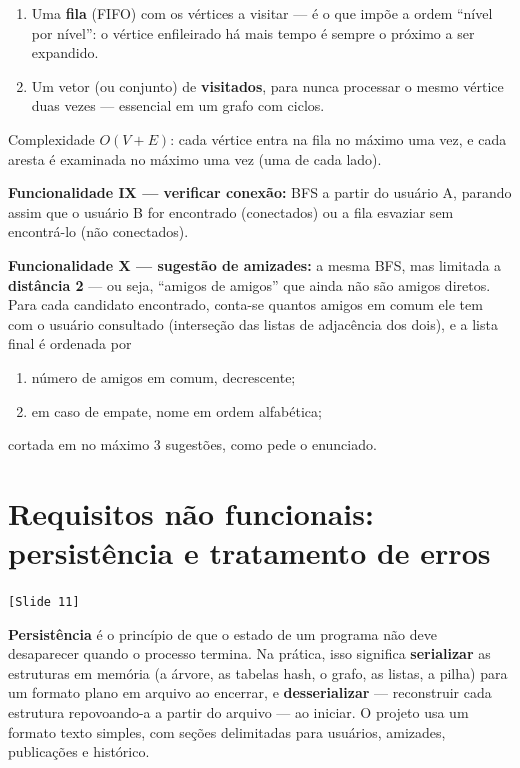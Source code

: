 \documentclass[11pt,a4paper]{article}
\newcommand{\slideref}[1]{\textcolor{accentwarm}{\texttt{[Slide #1]}}}
\begin{document}
\begin{enumerate}
  \item Uma \textbf{fila} (FIFO) com os vértices a visitar --- é o que impõe
    a ordem ``nível por nível'': o vértice enfileirado há mais tempo é
    sempre o próximo a ser expandido.
  \item Um vetor (ou conjunto) de \textbf{visitados}, para nunca processar o
    mesmo vértice duas vezes --- essencial em um grafo com ciclos.
\end{enumerate}

Complexidade $O(V+E)$: cada vértice entra na fila no máximo uma vez, e cada
aresta é examinada no máximo uma vez (uma de cada lado).

\textbf{Funcionalidade IX --- verificar conexão:} BFS a partir do usuário A,
parando assim que o usuário B for encontrado (conectados) ou a fila
esvaziar sem encontrá-lo (não conectados).

\textbf{Funcionalidade X --- sugestão de amizades:} a mesma BFS, mas
limitada a \textbf{distância 2} --- ou seja, ``amigos de amigos'' que ainda
não são amigos diretos. Para cada candidato encontrado, conta-se quantos
amigos em comum ele tem com o usuário consultado (interseção das listas de
adjacência dos dois), e a lista final é ordenada por
\begin{enumerate}
  \item número de amigos em comum, decrescente;
  \item em caso de empate, nome em ordem alfabética;
\end{enumerate}
cortada em no máximo 3 sugestões, como pede o enunciado.

\section{Requisitos não funcionais: persistência e tratamento de erros}
\slideref{11}

\textbf{Persistência} é o princípio de que o estado de um programa não deve
desaparecer quando o processo termina. Na prática, isso significa
\textbf{serializar} as estruturas em memória (a árvore, as tabelas hash, o
grafo, as listas, a pilha) para um formato plano em arquivo ao encerrar, e
\textbf{desserializar} --- reconstruir cada estrutura repovoando-a a partir
do arquivo --- ao iniciar. O projeto usa um formato texto simples, com seções
delimitadas para usuários, amizades, publicações e histórico.
\end{document}
